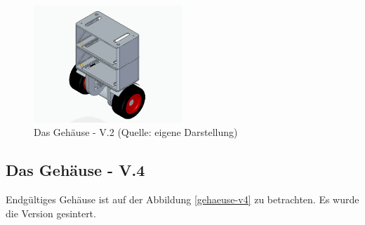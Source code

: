 \begin{figure}[!h]  %
	\centering\includegraphics[width=0.5\textwidth]{images/gehaeuse-v3.png}
	\caption{Das Gehäuse - V.2 \newline (Quelle: eigene Darstellung)}
	\label{gehaeuse-v3} %
\end{figure}

\subsection{Das Gehäuse - V.4}

Endgültiges Gehäuse ist auf der Abbildung \ref{gehaeuse-v4} zu betrachten. Es wurde die Version gesintert.

